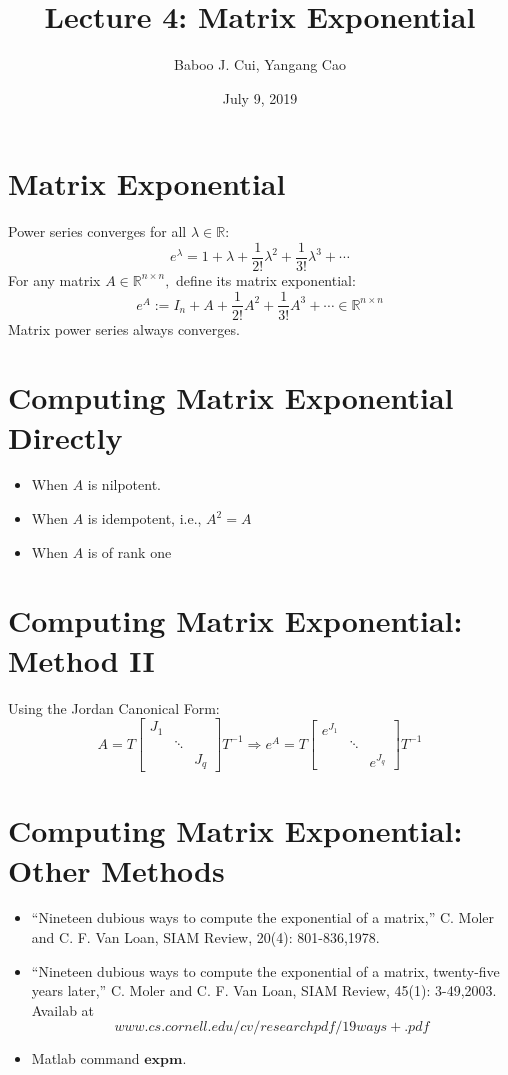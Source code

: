 \documentclass[10pt,a4paper,oneside]{article}
\date{July 9, 2019}
\author{Baboo J. Cui, Yangang Cao}
\title{Lecture 4: Matrix Exponential}
\begin{document}
\maketitle
\tableofcontents
\newpage
\section{Matrix Exponential}
Power series converges for all $\lambda\in\mathbb{R}$:
\[
e^{\lambda}=1+\lambda+\frac{1}{2 !} \lambda^{2}+\frac{1}{3 !} \lambda^{3}+\cdots
\]
For any matrix $A \in \mathbb{R}^{n \times n},$ define its matrix exponential:
\[
e^{A} :=I_{n}+A+\frac{1}{2 !} A^{2}+\frac{1}{3 !} A^{3}+\cdots \in \mathbb{R}^{n \times n}
\]
Matrix power series always converges.
\section{Computing Matrix Exponential Directly}
\begin{itemize}
\item When $A$ is nilpotent.
\item When $A$ is idempotent, i.e., $A^{2}=A$
\item When $A$ is of rank one
\end{itemize}
\section{Computing Matrix Exponential: Method II}
Using the Jordan Canonical Form:
\[
A=T\left[\begin{array}{lll}{J_{1}} & {} \\ {} & {\ddots} & {} \\ {} & {} & {J_{q}}\end{array}\right] T^{-1} \Rightarrow e^{A}=T\left[\begin{array}{ccc}{e^{J_{1}}} & {} & {} \\ {} & {\ddots} & {} \\ {} & {} & {e^{J_{q}}}\end{array}\right] T^{-1}
\]
\section{Computing Matrix Exponential: Other Methods}
\begin{itemize}
\item ``Nineteen dubious ways to compute the exponential of a matrix,'' C.
Moler and C. F. Van Loan, SIAM Review, 20(4): 801-836,1978.
\item ``Nineteen dubious ways to compute the exponential of a matrix,
twenty-five years later,'' C. Moler and C. F. Van Loan, SIAM Review,
45(1): 3-49,2003.\\
Availab at
\[
www.cs.cornell.edu/cv/researchpdf/19ways+.pdf
\]
\item Matlab command $\mathbf{expm}$.
\end{itemize}
\end{document}
